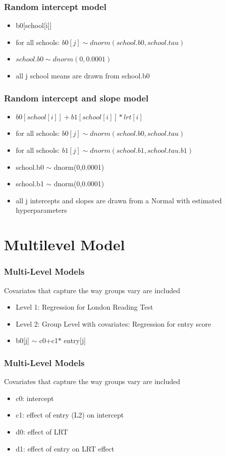 \documentclass[hyperref={pdfpagelabels=false},unknownkeysallowed]{beamer}
\begin{document}
\begin{frame}
\frametitle{Random intercept model}
\begin{itemize}
\item b0[school[i]]
\item for all schools: $b0[j] \sim dnorm(school.b0,school.tau) $
\item $school.b0 \sim dnorm(0,0.0001)$
\item all j school means are drawn from school.b0
\end{itemize}

\note{}
\end{frame}

\begin{frame}
\frametitle{Random intercept and slope model}
\begin{itemize}
\item $b0[school[i]]+b1[school[i]]*lrt[i]$
\item for all schools: $b0[j] \sim dnorm(school.b0,school.tau) $
\item for all schools: $b1[j] \sim dnorm(school.b1,school.tau.b1)$
\item school.b0 $\sim$ dnorm(0,0.0001)
\item school.b1 $\sim$ dnorm(0,0.0001)
\item all j intercepts and slopes are drawn from a Normal with estimated hyperparameters
\end{itemize}
\note{}
\end{frame}

\section{Multilevel Model}

\begin{frame}
\frametitle{Multi-Level Models}
Covariates that capture the way groups vary are included

\begin{itemize}
\item Level 1: Regression for London Reading Test
\item Level 2: Group Level with covariates: Regression for entry score
\item b0[j] $\sim$ c0+c1$*$ entry[j]
\end{itemize}
\note{}
\end{frame}

\begin{frame}
\frametitle{Multi-Level Models}
Covariates that capture the way groups vary are included

\begin{itemize}
\item c0: intercept
\item c1: effect of entry (L2) on intercept
\item d0: effect of LRT 
\item d1: effect of entry on LRT effect
\end{itemize} 
\note{}
\end{frame}

\end{document}
